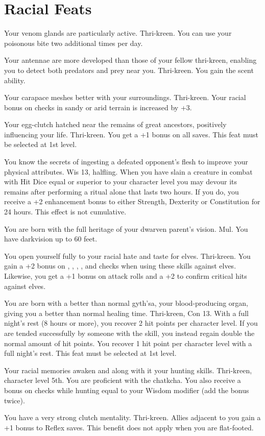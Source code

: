 \section{Racial Feats}

{Your venom glands are particularly active.}
{Thri-kreen.}
{You can use your poisonous bite two additional times per day.}
{}{}

{Your antennae are more developed than those of your fellow thri-kreen, enabling you to detect both predators and prey near you.}
{Thri-kreen.}
{You gain the scent ability.}
{}{}

{Your carapace meshes better with your surroundings.}
{Thri-kreen.}
{Your racial bonus on  checks in sandy or arid terrain is increased by +3.}
{}{}

{Your egg-clutch hatched near the remains of great ancestors, positively influencing your life.}
{Thri-kreen.}
{You get a +1 bonus on all saves.}
{}
{This feat must be selected at 1st level.}

{You know the secrets of ingesting a defeated opponent's flesh to improve your physical attributes.}
{Wis 13, halfling.}
{When you have slain a creature in combat with Hit Dice equal or superior to your character level you may devour its remains after performing a ritual alone that lasts two hours. If you do, you receive a +2 enhancement bonus to either Strength, Dexterity or Constitution for 24 hours. This effect is not cumulative.}
{}{}

{You are born with the full heritage of your dwarven parent's vision.}
{Mul.}
{You have darkvision up to 60 feet.}
{}{}

{You open yourself fully to your racial hate and taste for elves.}
{Thri-kreen.}
{You gain a +2 bonus on , , , , and  checks when using these skills against elves. Likewise, you get a +1 bonus on attack rolls and a +2 to confirm critical hits against elves.}
{}{}

{You are born with a better than normal gyth'sa, your blood-producing organ, giving you a better than normal healing time.}
{Thri-kreen, Con 13.}
{With a full night's rest (8 hours or more), you recover 2 hit points per character level. If you are tended successfully by someone with the  skill, you instead regain double the normal amount of hit points.}
{You recover 1 hit point per character level with a full night's rest.}
{This feat must be selected at 1st level.}

{Your racial memories awaken and along with it your hunting skills.}
{Thri-kreen, character level 5th.}
{You are proficient with the chatkcha. You also receive a bonus on  checks while hunting equal to your Wisdom modifier (add the bonus twice).}
{}{}

{You have a very strong clutch mentality.}
{Thri-kreen.}
{Allies adjacent to you gain a +1 bonus to Reflex saves. This benefit does not apply when you are flat-footed.}
{}{}